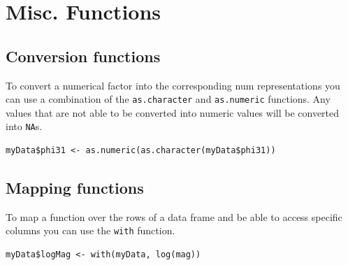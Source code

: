 \section{Misc. Functions}

\subsection{Conversion functions}
To convert a numerical factor into the corresponding num representations you can use a combination of the \verb|as.character| and \verb|as.numeric| functions. Any values that are not able to be converted into numeric values will be converted into \verb|NA|s.

\begin{verbatim}
myData$phi31 <- as.numeric(as.character(myData$phi31))
\end{verbatim}

\subsection{Mapping functions}
To map a function over the rows of a data frame and be able to access specific columns you can use the \verb|with| function.

\begin{verbatim}
myData$logMag <- with(myData, log(mag))
\end{verbatim}